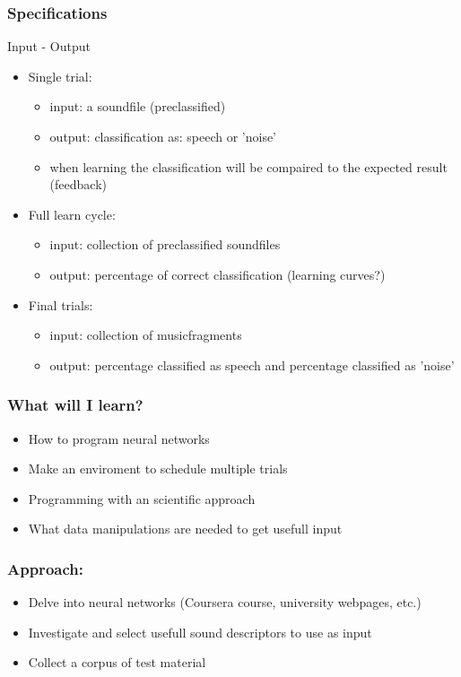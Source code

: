 \documentclass{beamer}
\begin{document}
\begin{frame}   %
    \frametitle{Specifications}
    Input - Output
    \begin{itemize}
        \item Single trial:
        \begin{itemize}
            \item input: a soundfile (preclassified)
            \item output: classification as: speech or 'noise'
            \item when learning the classification will be compaired to the expected result (feedback)
        \end{itemize}
        \item Full learn cycle:
        \begin{itemize}
            \item input: collection of preclassified soundfiles
            \item output: percentage of correct classification (learning curves?)
        \end{itemize}
        \item Final trials:
        \begin{itemize}
            \item input: collection of musicfragments
            \item output: percentage classified as speech and percentage classified as 'noise'
        \end{itemize}
    \end{itemize}
    
\end{frame}     %

\begin{frame}   %
    \frametitle{What will I learn?}
    \begin{itemize}
        \item How to program neural networks
        \item Make an enviroment to schedule multiple trials
        \item Programming with an scientific approach
        \item What data manipulations are needed to get usefull input
    \end{itemize}
\end{frame}     %

\begin{frame}   %
    \frametitle{Approach:}
    \begin{itemize}
        \item Delve into neural networks (Coursera course, university webpages, etc.)
        \item Investigate and select usefull sound descriptors to use as input
        \item Collect a corpus of test material
    \end{itemize} 

\end{frame}     %
\end{document}
